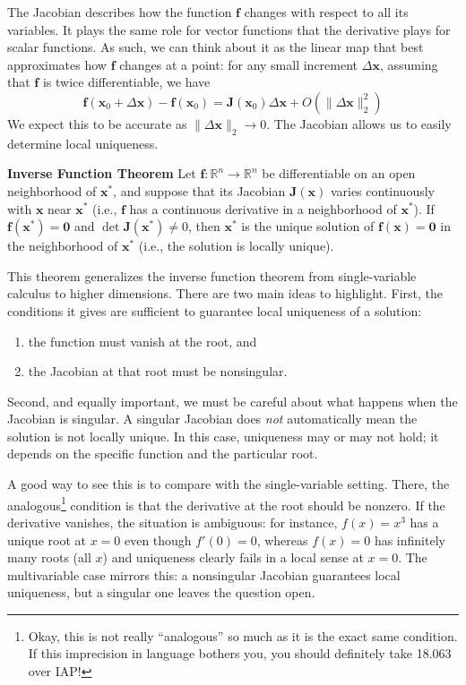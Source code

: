 The Jacobian describes how the function $\mathbf{f}$ changes with respect to all its variables. It plays the same role for vector functions that the derivative plays for scalar functions. As such, we can think about it as the linear map that best approximates how $\mathbf f$ changes at a point: for any small increment $\Delta \mathbf x$, assuming that $\mathbf f$ is twice differentiable, we have
\begin{equation}
\mathbf f(\mathbf x_0 + \Delta \mathbf x) - \mathbf f(\mathbf x_0)
= \mathbf{J}(\mathbf x_0) \Delta \mathbf x  + O(\|\Delta \mathbf x\|_2^2)
\label{eq:jacobian_approx}
\end{equation}
We expect this to be accurate as $\|\Delta \mathbf x\|_2 \to 0$. The Jacobian allows us to easily determine local uniqueness.
\begin{theoremBox}
    \textbf{Inverse Function Theorem}
    Let $\mathbf{f}:\mathbb{R}^n \to \mathbb{R}^n$ be differentiable on an open neighborhood of $\mathbf{x}^*$, and suppose that its Jacobian $\mathbf{J}(\mathbf{x})$ varies continuously with $\mathbf{x}$ near $\mathbf{x}^*$ (i.e., $\mathbf{f}$ has a continuous derivative in a neighborhood of $\mathbf{x}^*$). If $\mathbf{f}(\mathbf{x}^*)=\mathbf{0}$ and $\det \mathbf{J}(\mathbf{x}^*)\neq 0$, then $\mathbf{x}^*$ is the unique solution of $\mathbf{f}(\mathbf{x})=\mathbf{0}$ in the neighborhood of $\mathbf{x}^*$ (i.e., the solution is locally unique).
\end{theoremBox}

This theorem generalizes the inverse function theorem from single-variable calculus to higher dimensions. There are two main ideas to highlight. First, the conditions it gives are sufficient to guarantee local uniqueness of a solution:
\begin{enumerate}
\item the function must vanish at the root, and
\item the Jacobian at that root must be nonsingular.
\end{enumerate}
Second, and equally important, we must be careful about what happens when the Jacobian is singular. A singular Jacobian does \emph{not} automatically mean the solution is not locally unique. In this case, uniqueness may or may not hold; it depends on the specific function and the particular root.

A good way to see this is to compare with the single-variable setting. There, the analogous\footnote{Okay, this is not really ``analogous'' so much as it is the exact same condition. If this imprecision in language bothers you, you should definitely take 18.063 over IAP!} condition is that the derivative at the root should be nonzero. If the derivative vanishes, the situation is ambiguous: for instance, $f(x) = x^3$ has a unique root at $x=0$ even though $f'(0) = 0$, whereas $f(x) = 0$ has infinitely many roots (all $x$) and uniqueness clearly fails in a local sense at $x=0$. The multivariable case mirrors this: a nonsingular Jacobian guarantees local uniqueness, but a singular one leaves the question open.

